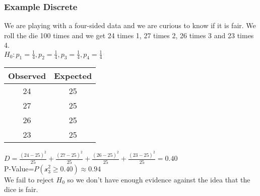 \documentclass{article}
\begin{document}
\subsubsection{Example Discrete}
We are playing with a four-sided data and we are curious to know if it is fair. We roll the die 100 times and we get 24 times 1, 27 times 2, 26 times 3 and 23 times 4.\\
$H_0:p_1=\frac{1}{4},p_2=\frac{1}{4},p_3=\frac{1}{4},p_4=\frac{1}{4}$
\begin{center}
    \begin{tabular}{c|c}
        Observed & Expected \\
        \hline
        24 & 25\\
        \hline
        27 & 25\\
        \hline
        26 & 25\\
        \hline
        23 & 25
    \end{tabular}
\end{center}
$D=\frac{(24-25)^2}{25}+\frac{(27-25)^2}{25}+\frac{(26-25)^2}{25}+\frac{(23-25)^2}{25}=0.40$\\
P-Value=$P(\mathcal{x}^2_3\geq 0.40)\approx 0.94$\\
We fail to reject $H_0$ so we don't have enough evidence against the idea that the dice is fair.
\end{document}

